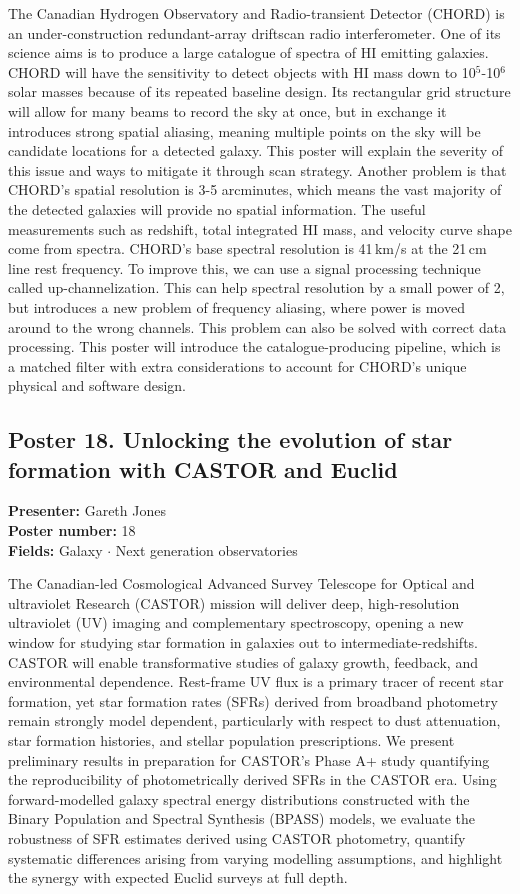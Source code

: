 The Canadian Hydrogen Observatory and Radio-transient Detector (CHORD) is an under-construction redundant-array driftscan radio interferometer. One of its science aims is to produce a large catalogue of spectra of HI emitting galaxies. CHORD will have the sensitivity to detect objects with HI mass down to 10$^5$-10$^6$ solar masses because of its repeated baseline design. Its rectangular grid structure will allow for many beams to record the sky at once, but in exchange it introduces strong spatial aliasing, meaning multiple points on the sky will be candidate locations for a detected galaxy. This poster will explain the severity of this issue and ways to mitigate it through scan strategy. Another problem is that CHORD's spatial resolution is 3-5 arcminutes, which means the vast majority of the detected galaxies will provide no spatial information. The useful measurements such as redshift, total integrated HI mass, and velocity curve shape come from spectra. CHORD's base spectral resolution is 41\,km/s at the 21\,cm line rest frequency. To improve this, we can use a signal processing technique called up-channelization. This can help spectral resolution by a small power of 2, but introduces a new problem of frequency aliasing, where power is moved around to the wrong channels. This problem can also be solved with correct data processing. This poster will introduce the catalogue-producing pipeline, which is a matched filter with extra considerations to account for CHORD's unique physical and software design.

\hypertarget{poster-abstract-talk-212}{}\label{poster-abstract-page-talk-212}
\subsection*{Poster 18. Unlocking the evolution of star formation with CASTOR and Euclid}
\textbf{Presenter:} Gareth Jones\\
\textbf{Poster number:} 18\\
\textbf{Fields:} Galaxy $\cdot$ Next generation observatories

The Canadian-led Cosmological Advanced Survey Telescope for Optical and ultraviolet Research (CASTOR) mission will deliver deep, high-resolution ultraviolet (UV) imaging and complementary spectroscopy, opening a new window for studying star formation in galaxies out to intermediate-redshifts. CASTOR will enable transformative studies of galaxy growth, feedback, and environmental dependence. Rest-frame UV flux is a primary tracer of recent star formation, yet star formation rates (SFRs) derived from broadband photometry remain strongly model dependent, particularly with respect to dust attenuation, star formation histories, and stellar population prescriptions. We present preliminary results in preparation for CASTOR's Phase A+ study quantifying the reproducibility of photometrically derived SFRs in the CASTOR era. Using forward-modelled galaxy spectral energy distributions constructed with the Binary Population and Spectral Synthesis (BPASS) models, we evaluate the robustness of SFR estimates derived using CASTOR photometry, quantify systematic differences arising from varying modelling assumptions, and highlight the synergy with expected Euclid surveys at full depth.

